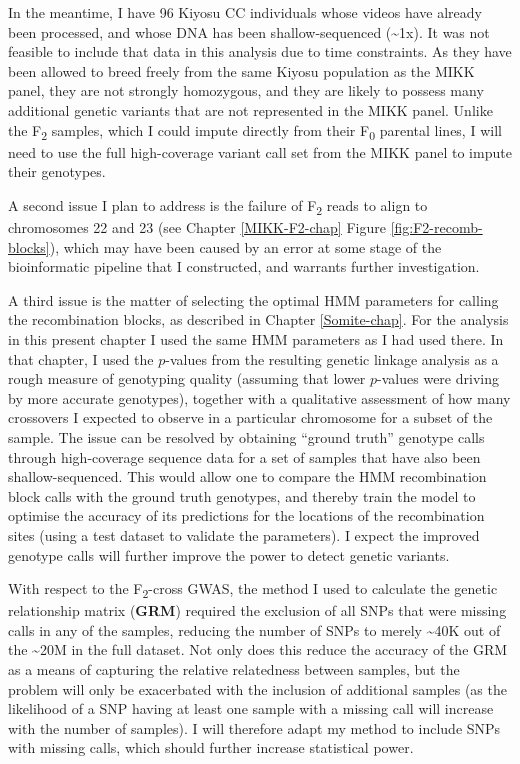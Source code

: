\documentclass[
]{book}
\begin{document}
In the meantime, I have 96 Kiyosu CC individuals whose videos have already been processed, and whose DNA has been shallow-sequenced (\textasciitilde1x). It was not feasible to include that data in this analysis due to time constraints. As they have been allowed to breed freely from the same Kiyosu population as the MIKK panel, they are not strongly homozygous, and they are likely to possess many additional genetic variants that are not represented in the MIKK panel. Unlike the F\textsubscript{2} samples, which I could impute directly from their F\textsubscript{0} parental lines, I will need to use the full high-coverage variant call set from the MIKK panel to impute their genotypes.

A second issue I plan to address is the failure of F\textsubscript{2} reads to align to chromosomes 22 and 23 (see Chapter \ref{MIKK-F2-chap} Figure \ref{fig:F2-recomb-blocks}), which may have been caused by an error at some stage of the bioinformatic pipeline that I constructed, and warrants further investigation.

A third issue is the matter of selecting the optimal HMM parameters for calling the recombination blocks, as described in Chapter \ref{Somite-chap}. For the analysis in this present chapter I used the same HMM parameters as I had used there. In that chapter, I used the \(p\)-values from the resulting genetic linkage analysis as a rough measure of genotyping quality (assuming that lower \(p\)-values were driving by more accurate genotypes), together with a qualitative assessment of how many crossovers I expected to observe in a particular chromosome for a subset of the sample. The issue can be resolved by obtaining ``ground truth'' genotype calls through high-coverage sequence data for a set of samples that have also been shallow-sequenced. This would allow one to compare the HMM recombination block calls with the ground truth genotypes, and thereby train the model to optimise the accuracy of its predictions for the locations of the recombination sites (using a test dataset to validate the parameters). I expect the improved genotype calls will further improve the power to detect genetic variants.

With respect to the F\textsubscript{2}-cross GWAS, the method I used to calculate the genetic relationship matrix (\textbf{GRM}) required the exclusion of all SNPs that were missing calls in any of the samples, reducing the number of SNPs to merely \textasciitilde40K out of the \textasciitilde20M in the full dataset. Not only does this reduce the accuracy of the GRM as a means of capturing the relative relatedness between samples, but the problem will only be exacerbated with the inclusion of additional samples (as the likelihood of a SNP having at least one sample with a missing call will increase with the number of samples). I will therefore adapt my method to include SNPs with missing calls, which should further increase statistical power.
\end{document}
